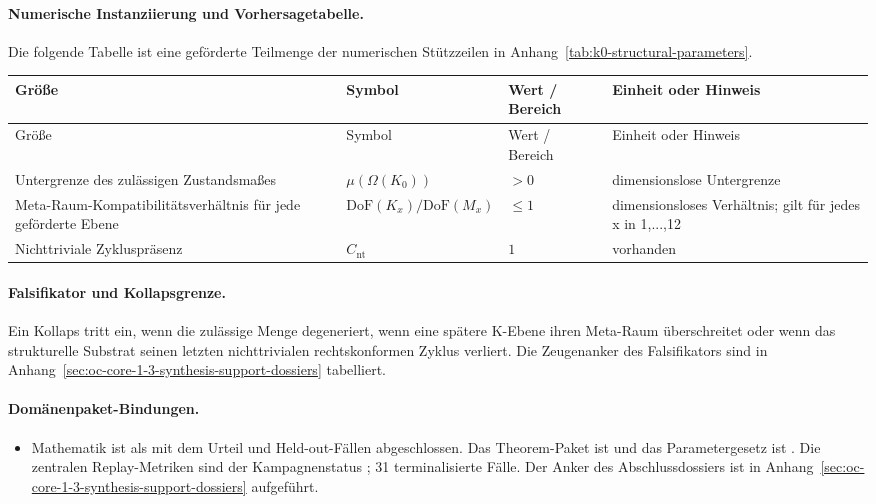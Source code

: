 \paragraph{Numerische Instanziierung und Vorhersagetabelle.}
Die folgende Tabelle ist eine geförderte Teilmenge der numerischen Stützzeilen in Anhang~\ref{tab:k0-structural-parameters}.
\begin{longtable}{@{}L{0.27\textwidth}L{0.15\textwidth}L{0.24\textwidth}L{0.16\textwidth}@{}}
\toprule
Größe & Symbol & Wert / Bereich & Einheit oder Hinweis \\
\midrule
\endfirsthead
\toprule
Größe & Symbol & Wert / Bereich & Einheit oder Hinweis \\
\midrule
\endhead
Untergrenze des zulässigen Zustandsmaßes & $\scriptstyle \mu(\Omega(K_0))$ & $> 0$ & dimensionslose Untergrenze \\
Meta-Raum-Kompatibilitätsverhältnis für jede geförderte Ebene & $\scriptstyle \mathrm{DoF}(K_x)/\allowbreak \mathrm{DoF}(M_x)$ & $\leq 1$ & dimensionsloses Verhältnis; gilt für jedes x in 1,...,12 \\
Nichttriviale Zykluspräsenz & $\scriptstyle C_{\mathrm{nt}}$ & $1$ & vorhanden \\
\bottomrule
\end{longtable}

\paragraph{Falsifikator und Kollapsgrenze.}
Ein Kollaps tritt ein, wenn die zulässige Menge degeneriert, wenn eine spätere K-Ebene ihren Meta-Raum überschreitet oder wenn das strukturelle Substrat seinen letzten nichttrivialen rechtskonformen Zyklus verliert.
Die Zeugenanker des Falsifikators sind in Anhang~\ref{sec:oc-core-1-3-synthesis-support-dossiers} tabelliert.

\paragraph{Domänenpaket-Bindungen.}
\begin{itemize}[leftmargin=1.6em,nosep]
\item Mathematik ist als  mit dem Urteil  und  Held-out-Fällen abgeschlossen. Das Theorem-Paket ist  und das Parametergesetz ist . Die zentralen Replay-Metriken sind der Kampagnenstatus ; 31 terminalisierte Fälle. Der Anker des Abschlussdossiers ist in Anhang~\ref{sec:oc-core-1-3-synthesis-support-dossiers} aufgeführt.
\end{itemize}


